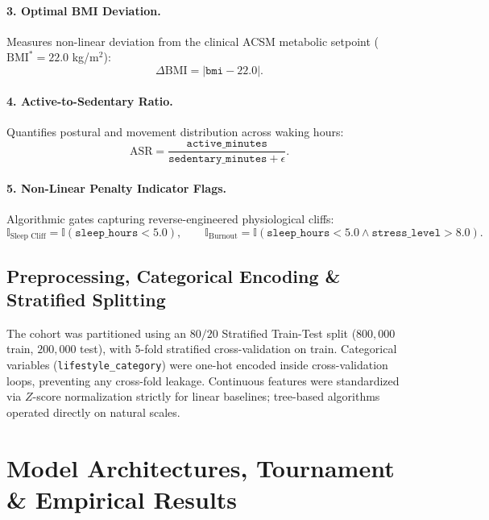 \documentclass[11pt,a4paper]{article}
\begin{document}
\paragraph{3. Optimal BMI Deviation.} Measures non-linear deviation from the clinical ACSM metabolic setpoint ($\text{BMI}^* = 22.0$ kg/m$^2$):
\begin{equation}
\Delta\mathrm{BMI} = |\texttt{bmi} - 22.0|.
\end{equation}

\paragraph{4. Active-to-Sedentary Ratio.} Quantifies postural and movement distribution across waking hours:
\begin{equation}
\mathrm{ASR} = \frac{\texttt{active\_minutes}}{\texttt{sedentary\_minutes} + \epsilon}.
\end{equation}

\paragraph{5. Non-Linear Penalty Indicator Flags.} Algorithmic gates capturing reverse-engineered physiological cliffs:
\begin{equation}
\mathbb{I}_{\text{Sleep Cliff}} = \mathbb{I}(\texttt{sleep\_hours} < 5.0), \qquad \mathbb{I}_{\text{Burnout}} = \mathbb{I}(\texttt{sleep\_hours} < 5.0 \land \texttt{stress\_level} > 8.0).
\end{equation}

\subsection{Preprocessing, Categorical Encoding \& Stratified Splitting}
The cohort was partitioned using an $80/20$ Stratified Train-Test split ($800{,}000$ train, $200{,}000$ test), with 5-fold stratified cross-validation on train. Categorical variables (\texttt{lifestyle\_category}) were one-hot encoded inside cross-validation loops, preventing any cross-fold leakage. Continuous features were standardized via $Z$-score normalization strictly for linear baselines; tree-based algorithms operated directly on natural scales.

\section{Model Architectures, Tournament \& Empirical Results}
\end{document}
